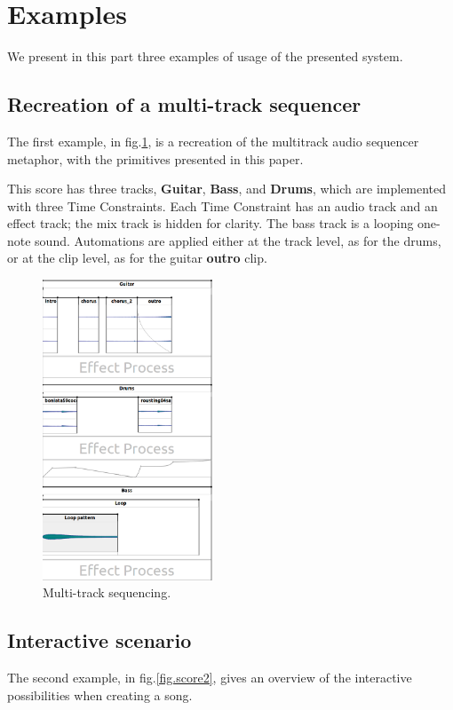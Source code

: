 \documentclass{article}
\begin{document}
\section{Examples}
We present in this part three examples of usage of the presented system.

\subsection{Recreation of a multi-track sequencer}
The first example, in fig.\ref{fig.score1}, is a recreation of the multitrack audio sequencer metaphor, with the primitives presented in this paper.
 
This score has three tracks, \textbf{Guitar}, \textbf{Bass}, and \textbf{Drums}, which are implemented with three Time Constraints.
Each Time Constraint has an audio track and an effect track; the mix track is hidden for clarity.
The bass track is a looping one-note sound. Automations are applied either at the track level, as for the drums, or at the clip level, as for the guitar \textbf{outro} clip.
 
\begin{figure}[h]
    \centering
    \includegraphics[width=0.45\textwidth]{figures/ex1.png}
    \caption{Multi-track sequencing.}
    \label{fig.score1}
\end{figure}

\subsection{Interactive scenario}
The second example, in fig.\ref{fig.score2}, gives an overview of the interactive possibilities when creating a song.
\end{document}

